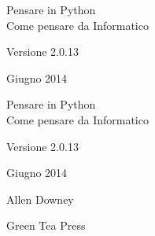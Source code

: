 \documentclass[10pt]{book}
\newcommand{\theversion}{2.0.13}
\newcommand{\thedate}{Giugno 2014}
\begin{document}
\begin{latexonly}

\renewcommand{\blankpage}{\thispagestyle{empty} \quad \newpage}



\thispagestyle{empty}

\begin{flushright}
\vspace*{2.0in}

\begin{spacing}{3}
{\huge Pensare in Python}\\
{\Large Come pensare da Informatico}
\end{spacing}

\vspace{0.25in}

Versione \theversion

\thedate

\vfill

\end{flushright}


\blankpage
\blankpage

\pagebreak
\thispagestyle{empty}

\begin{flushright}
\vspace*{2.0in}

\begin{spacing}{3}
{\huge Pensare in Python}\\
{\Large Come pensare da Informatico}
\end{spacing}

\vspace{0.25in}

Versione \theversion

\thedate

\vspace{1in}


{\Large
Allen Downey\\
}


\vspace{0.5in}

{\Large Green Tea Press}


\end{flushright}
\end{latexonly}
\end{document}
